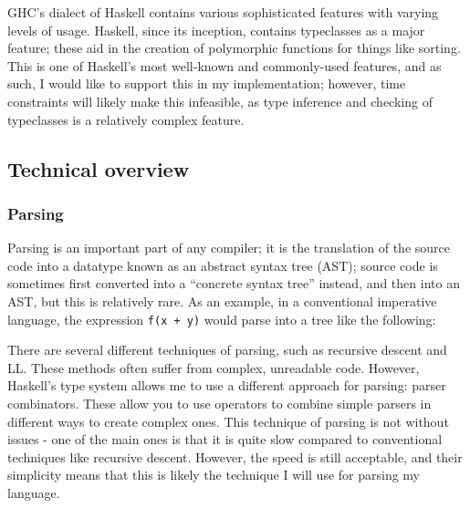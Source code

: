 \documentclass[9pt]{extarticle}
\begin{document}
GHC's dialect of Haskell contains various sophisticated features with varying
levels of usage. Haskell, since its inception, contains typeclasses as a major
feature; these aid in the creation of polymorphic functions for things like
sorting. This is one of Haskell's most well-known and commonly-used features,
and as such, I would like to support this in my implementation; however, time
constraints will likely make this infeasible, as type inference and checking of
typeclasses is a relatively complex feature. 

\subsection{Technical overview}

\subsubsection{Parsing}

Parsing is an important part of any compiler; it is the translation of the
source code into a datatype known as an abstract syntax tree (AST); source code
is sometimes first converted into a ``concrete syntax tree'' instead, and then
into an AST, but this is relatively rare. As an example, in a conventional
imperative language, the expression \verb'f(x + y)' would parse into a tree like the
following:

\vspace{0.5cm}

\begin{center}
\end{center}

\vspace{0.5cm}

There are several different techniques of parsing, such as recursive descent and
LL. These methods often suffer from complex, unreadable code. However, Haskell's
type system allows me to use a different approach for parsing: parser
combinators. These allow you to use operators to combine simple parsers in
different ways to create complex ones. This technique of parsing is not without
issues - one of the main ones is that it is quite slow compared to conventional
techniques like recursive descent. However, the speed is still acceptable, and
their simplicity means that this is likely the technique I will use for parsing
my language.
\end{document}
